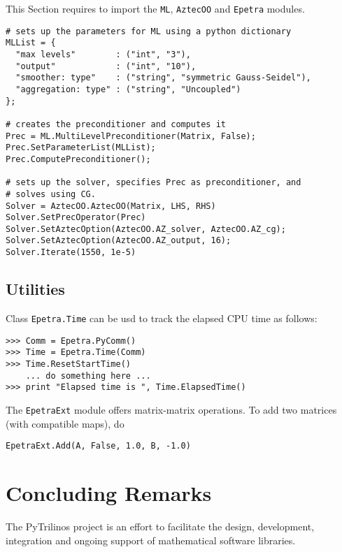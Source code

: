 \documentclass[10pt,relax]{SANDreport}
\begin{document}
This Section requires to import the {\tt ML}, {\tt AztecOO} and {\tt Epetra}
modules.

\begin{verbatim}
# sets up the parameters for ML using a python dictionary
MLList = {
  "max levels"        : ("int", "3"),
  "output"            : ("int", "10"),
  "smoother: type"    : ("string", "symmetric Gauss-Seidel"),
  "aggregation: type" : ("string", "Uncoupled")
};

# creates the preconditioner and computes it
Prec = ML.MultiLevelPreconditioner(Matrix, False);
Prec.SetParameterList(MLList);
Prec.ComputePreconditioner();

# sets up the solver, specifies Prec as preconditioner, and
# solves using CG.
Solver = AztecOO.AztecOO(Matrix, LHS, RHS)
Solver.SetPrecOperator(Prec)
Solver.SetAztecOption(AztecOO.AZ_solver, AztecOO.AZ_cg);
Solver.SetAztecOption(AztecOO.AZ_output, 16);
Solver.Iterate(1550, 1e-5)
\end{verbatim}

\subsection{Utilities}
\label{sec:utilities}

Class {\tt Epetra.Time} can be usd to track the elapsed CPU time as follows:
\begin{verbatim}
>>> Comm = Epetra.PyComm()
>>> Time = Epetra.Time(Comm)
>>> Time.ResetStartTime()
    ... do something here ...
>>> print "Elapsed time is ", Time.ElapsedTime()
\end{verbatim}

The {\tt EpetraExt} module offers matrix-matrix operations. To add two matrices
(with compatible maps), do
\begin{verbatim}
EpetraExt.Add(A, False, 1.0, B, -1.0)
\end{verbatim}

\section{Concluding Remarks}
\label{sec:concluding}

The PyTrilinos project is an effort to facilitate the design, development,
  integration and ongoing support of mathematical software libraries. 
\end{document}

